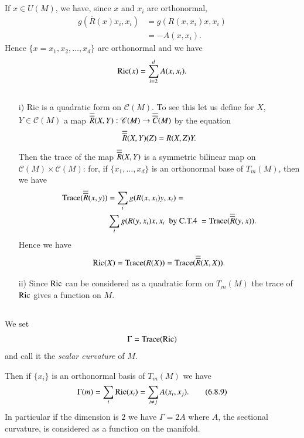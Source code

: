 \subsection{}\label{chap6:6.8.6}

\begin{note*}
If $x\in U(M)$, we have, since $x$ and $x_{i}$ are orthonormal,
\begin{align*}
g(\overline{R}(x)x_{i},x_{i}) &= g(R(x,x_{i})x,x_{i})\\
&=-A(x,x_{i}).
\end{align*}
Hence $\{x=x_{1},x_{2},\ldots,x_{d}\}$ are orthonormal and we have
$$
\operatorname{Ric}(x)=\sum^{d}_{i=2}A(x,x_{i}).
$$
\end{note*}

\subsection{}\label{chap6:6.8.7}


\begin{remarks*}
\begin{itemize}
\item[i)] Ric is a quadratic form on $\mathscr{C}(M)$. To see this let
  us define for $X$, $Y\in\mathscr{C}(M)$ a map
  $\overline{\overline{R}}(X,Y):\mathscr{C}(M)\to \overline{\overline{C}}(M)$ by the equation
$$
\overline{\overline{R}}(X,Y)(Z)=R(X,Z)Y.
$$
Then \pageoriginale the trace of the map $\overline{\overline{R}}(X,Y)$ is a symmetric
bilinear map 
on $\mathscr{C}(M)\times\mathscr{C}(M)$: for, if
$\{x_{1},\ldots,x_{d}\}$ is an orthonormal base of $T_{m}(M)$, then we
have
\begin{align*}
\operatorname{Trace}(\overline{\overline{R}}(x,y)) &= \sum_{i}g(R(x,x_{i})y,x_{i})=\\
& \sum_{i}g(R(y,x_{i})x,x_{i}\text{ \ by C.T.4 } = \operatorname{Trace}(\overline{\overline{R}}(y,x)).
\end{align*}
Hence we have
$$
\operatorname{Ric}(X)=\operatorname{Trace} (R(X))=\operatorname{Trace} (\overline{\overline{R}}(X,X)).
$$

\item[ii)] Since $\operatorname{Ric}$ can be considered as a quadratic form on
  $T_{m}(M)$ the trace of $\operatorname{Ric}$ gives a function on $M$.
\end{itemize}
\end{remarks*}


\subsection{}\label{chap6:6.8.8}

\begin{defi*}
We set
$$
\Gamma=\operatorname{Trace}(\operatorname{Ric})
$$
and call it the {\em scalar curvature} of $M$.

Then if $\{x_{i}\}$ is an orthonormal basis of $T_{m}(M)$ we have
\begin{equation*}
\Gamma(m)=\sum_{i}\operatorname{Ric}(x_{i})=\sum_{i\neq
  j}A(x_{i},x_{j}).\tag{6.8.9}\label{chap6:6.8.9} 
\end{equation*}
In particular if the dimension is $2$ we have $\Gamma=2A$ where $A$,
the sectional curvature, is considered as a function on the manifold.
\end{defi*}

